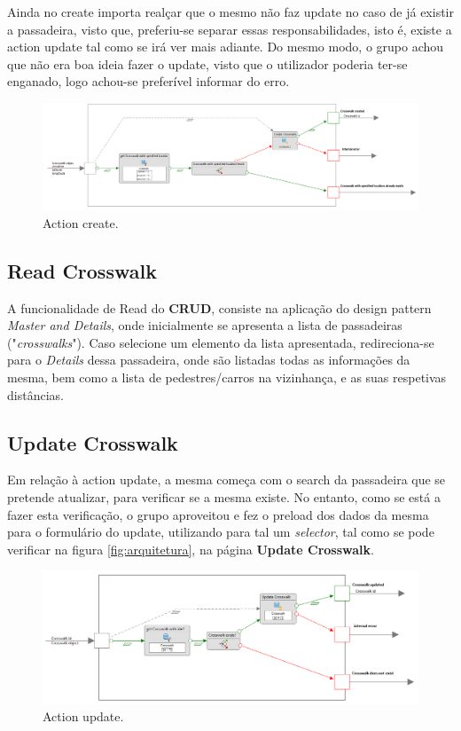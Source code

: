 \documentclass[11pt,a4paper]{report}%
\begin{document}
\hspace{5mm} Ainda no create importa realçar que o mesmo não faz update no caso de já existir a passadeira, visto que, preferiu-se separar essas responsabilidades, isto é, existe a action update tal como se irá ver mais adiante. Do mesmo modo, o grupo achou que não era boa ideia fazer o update, visto que o utilizador poderia ter-se enganado, logo achou-se preferível informar do erro.

\begin{figure}[H]
    \centering
    \includegraphics[scale=0.5]{create.PNG}
    \caption{Action create.}
    \label{fig:mod_dom}
\end{figure}

\subsection{Read Crosswalk}
\hspace{5mm} A funcionalidade de Read do \textbf{CRUD}, consiste na aplicação do design pattern \textit{Master and Details}, onde inicialmente se apresenta a lista de passadeiras ("\textit{crosswalks}"). Caso selecione um elemento da lista apresentada, redireciona-se para o \textit{Details} dessa passadeira, onde são listadas todas as informações da mesma, bem como a lista de pedestres/carros na vizinhança, e as suas respetivas distâncias.

\subsection{Update Crosswalk}
\hspace{5mm} Em relação à action update, a mesma começa com o search da passadeira que se pretende atualizar, para verificar se a mesma existe. No entanto, como se está a fazer esta verificação, o grupo aproveitou e fez o preload dos dados da mesma para o formulário do update, utilizando para tal um \textit{selector}, tal como se pode verificar na figura \ref{fig:arquitetura}, na página \textbf{Update Crosswalk}.

\begin{figure}[H]
    \centering
    \includegraphics[scale=0.55]{update.PNG}
    \caption{Action update.}
    \label{fig:mod_dom}
\end{figure}
\end{document}
